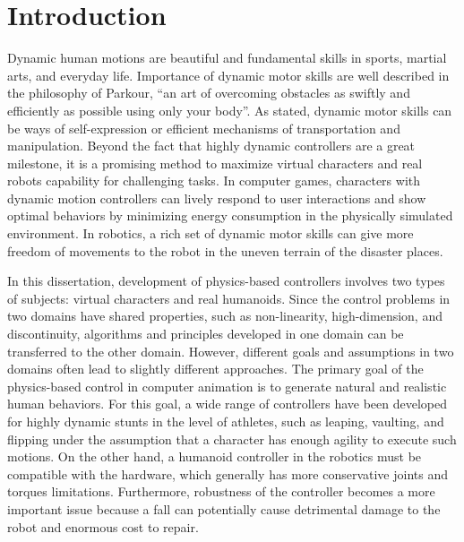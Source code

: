 \chapter{Introduction}
Dynamic human motions are beautiful and fundamental skills in sports,
martial arts, and everyday life.
Importance of dynamic motor skills are well described in the philosophy of
Parkour, “an art of overcoming obstacles as swiftly and efficiently as
possible using only your body”.
As stated, dynamic motor skills can be ways of self-expression or
efficient mechanisms of transportation and manipulation.
Beyond the fact that highly dynamic controllers are a great milestone, 
it is a promising method to maximize virtual characters and real robots
capability for challenging tasks.
In computer games, characters with dynamic motion controllers can 
lively respond to user interactions and show optimal behaviors 
by minimizing energy consumption in the physically simulated environment.
In robotics, a rich set of dynamic motor skills can give more freedom of
movements to the robot in the uneven terrain of the disaster places.

In this dissertation, development of physics-based controllers involves
two types of subjects: virtual characters and real humanoids.
Since the control problems in two domains have shared properties, such as
non-linearity, high-dimension, and discontinuity, algorithms and principles
developed in one domain can be transferred to the other domain.
However, different goals and assumptions in two domains often lead to
slightly different approaches.
The primary goal of the physics-based control in computer animation is to
generate natural and realistic human behaviors.
For this goal, a wide range of controllers have been developed for highly
dynamic stunts in the level of athletes, such as leaping, vaulting, and
flipping under the assumption that a character has enough agility to execute such motions.
On the other hand, a humanoid controller in the robotics must be compatible 
with the hardware, which generally has more conservative joints and torques
limitations.
Furthermore, robustness of the controller becomes a more important issue
because a fall can potentially cause detrimental damage to the robot and
enormous cost to repair.

